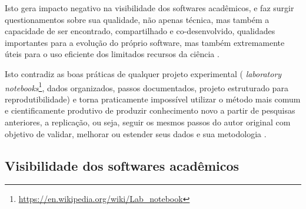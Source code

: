 Isto gera impacto negativo na visibilidade dos softwares acadêmicos, e faz
surgir questionamentos sobre sua qualidade, não apenas técnica, mas também a
capacidade de ser encontrado, compartilhado e co-desenvolvido, qualidades
importantes para a evolução do próprio software, mas também extremamente úteis
para o uso eficiente dos limitados recursos da ciência \cite{howison2013,
katz2014transitive}.

%

%

Isto contradiz as boas práticas de qualquer projeto experimental ({\it
laboratory
notebooks}\footnote{\url{https://en.wikipedia.org/wiki/Lab_notebook}}, dados
organizados, passos documentados, projeto estruturado para reprodutibilidade) e
torna praticamente impossível utilizar o método mais comum e cientificamente
produtivo de produzir conhecimento novo a partir de pesquisas anteriores, a
replicação, ou seja, seguir os mesmos passos do autor original com
objetivo de validar, melhorar ou estender seus dados e sua metodologia
\cite{king1995replication, Stodden2010}.

\subsection{Visibilidade dos softwares acadêmicos}

%
%

